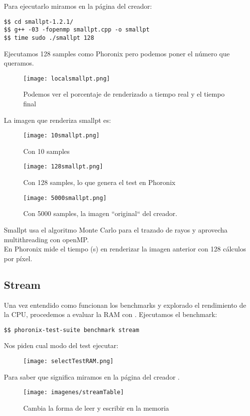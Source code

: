 Para ejecutarlo miramos en la página del creador: \cite{smallpt}
\begin{verbatim}
$$ cd smallpt-1.2.1/
$$ g++ -03 -fopenmp smallpt.cpp -o smallpt
$$ time sudo ./smallpt 128
\end{verbatim}

Ejecutamos 128 samples como Phoronix pero podemos poner el número que queramos.
\begin{figure}[H]
	\centering
	\texttt{[image: localsmallpt.png]}
	\caption{Podemos ver el porcentaje de renderizado a tiempo real y el tiempo final}
\end{figure}

La imagen que renderiza smallpt es:
\begin{figure}[H]
	\centering
	\texttt{[image: 10smallpt.png]}
	\caption{Con 10 samples}
\end{figure}

\begin{figure}[H]
	\centering
	\texttt{[image: 128smallpt.png]}
	\caption{Con 128 samples, lo que genera el test en Phoronix}
\end{figure}
\begin{figure}[H]
	\centering
	\texttt{[image: 5000smallpt.png]}
	\caption{Con 5000 samples, la imagen ``original`` del creador.}
\end{figure}

Smallpt usa el algoritmo Monte Carlo para el trazado de rayos y aprovecha multithreading con openMP.\\
En Phoronix mide el tiempo (s) en renderizar la imagen anterior con 128 cálculos por píxel.

\subsection{Stream}
Una vez entendido como funcionan los benchmarks y explorado el rendimiento de la CPU, procedemos a evaluar la RAM con . Ejecutamos el benchmark:
\begin{verbatim}
$$ phoronix-test-suite benchmark stream
\end{verbatim}

Nos piden cual modo del test ejecutar:

\begin{figure}[H]
	\centering
	\texttt{[image: selectTestRAM.png]}
\end{figure}
Para saber que significa miramos en la página del creador \cite{streamWeb}.
\begin{figure}[H]
	\centering
	\texttt{[image: imagenes/streamTable]}
	\caption{Cambia la forma de leer y escribir en la memoria}
	\label{fig:tablestream}
\end{figure}

